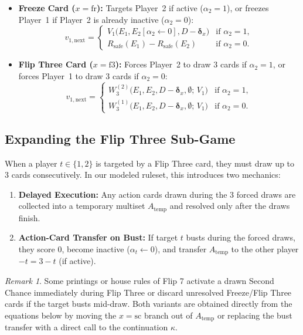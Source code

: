 \documentclass{article}
\theoremstyle{plain}
\theoremstyle{definition}
\theoremstyle{remark}
\newtheorem*{remark}{Remark}
\begin{document}
\begin{itemize}
    \item \textbf{Freeze Card ($x = \text{fr}$):} Targets Player~2 if active ($\alpha_2 = 1$), or freezes Player~1 if Player~2 is already inactive ($\alpha_2 = 0$):
    \[
        v_{1,\text{next}} =
        \begin{cases}
            V_1\big(E_1, E_2[\alpha_2 \leftarrow 0], D - \boldsymbol{\delta}_x\big) & \text{if } \alpha_2 = 1, \\
            R_{\text{safe}}(E_1) - R_{\text{safe}}(E_2) & \text{if } \alpha_2 = 0.
        \end{cases}
    \]

    \item \textbf{Flip Three Card ($x = \text{f3}$):} Forces Player~2 to draw $3$ cards if $\alpha_2 = 1$, or forces Player~1 to draw $3$ cards if $\alpha_2 = 0$:
    \[
        v_{1,\text{next}} =
        \begin{cases}
            W_3^{(2)}\big(E_1, E_2, D - \boldsymbol{\delta}_x, \emptyset; \, V_1\big) & \text{if } \alpha_2 = 1, \\
            W_3^{(1)}\big(E_1, E_2, D - \boldsymbol{\delta}_x, \emptyset; \, V_1\big) & \text{if } \alpha_2 = 0.
        \end{cases}
    \]
\end{itemize}

\subsection{Expanding the Flip Three Sub-Game}
When a player $t \in \{1, 2\}$ is targeted by a Flip Three card, they must draw up to $3$ cards consecutively. In our modeled ruleset, this introduces two mechanics:
\begin{enumerate}
    \item \textbf{Delayed Execution:} Any action cards drawn during the $3$ forced draws are collected into a temporary multiset $A_{\text{temp}}$ and resolved only after the draws finish.
    \item \textbf{Action-Card Transfer on Bust:} If target $t$ busts during the forced draws, they score $0$, become inactive ($\alpha_t \leftarrow 0$), and transfer $A_{\text{temp}}$ to the other player $-t = 3 - t$ (if active).
\end{enumerate}
\begin{remark}
Some printings or house rules of Flip 7 activate a drawn Second Chance immediately during Flip Three or discard unresolved Freeze/Flip Three cards if the target busts mid-draw. Both variants are obtained directly from the equations below by moving the $x = \text{sc}$ branch out of $A_{\text{temp}}$ or replacing the bust transfer with a direct call to the continuation $\kappa$.
\end{remark}
\end{document}
